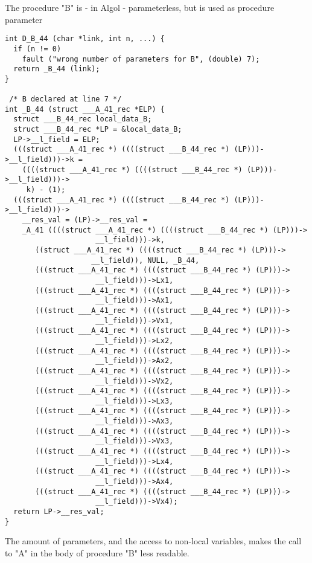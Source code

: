\documentclass[11pt]{article}
\begin{document}
The procedure "B" is - in Algol - parameterless, but is used as procedure
parameter
{\small
\begin{verbatim}
int D_B_44 (char *link, int n, ...) {
  if (n != 0)
    fault ("wrong number of parameters for B", (double) 7);
  return _B_44 (link);
}

 /* B declared at line 7 */
int _B_44 (struct ___A_41_rec *ELP) {
  struct ___B_44_rec local_data_B;
  struct ___B_44_rec *LP = &local_data_B;
  LP->__l_field = ELP;
  (((struct ___A_41_rec *) ((((struct ___B_44_rec *) (LP)))->__l_field)))->k =
    ((((struct ___A_41_rec *) ((((struct ___B_44_rec *) (LP)))->__l_field)))->
     k) - (1);
  (((struct ___A_41_rec *) ((((struct ___B_44_rec *) (LP)))->__l_field)))->
    __res_val = (LP)->__res_val =
    _A_41 ((((struct ___A_41_rec *) ((((struct ___B_44_rec *) (LP)))->
				     __l_field)))->k,
	   ((struct ___A_41_rec *) ((((struct ___B_44_rec *) (LP)))->
				    __l_field)), NULL, _B_44,
	   (((struct ___A_41_rec *) ((((struct ___B_44_rec *) (LP)))->
				     __l_field)))->Lx1,
	   (((struct ___A_41_rec *) ((((struct ___B_44_rec *) (LP)))->
				     __l_field)))->Ax1,
	   (((struct ___A_41_rec *) ((((struct ___B_44_rec *) (LP)))->
				     __l_field)))->Vx1,
	   (((struct ___A_41_rec *) ((((struct ___B_44_rec *) (LP)))->
				     __l_field)))->Lx2,
	   (((struct ___A_41_rec *) ((((struct ___B_44_rec *) (LP)))->
				     __l_field)))->Ax2,
	   (((struct ___A_41_rec *) ((((struct ___B_44_rec *) (LP)))->
				     __l_field)))->Vx2,
	   (((struct ___A_41_rec *) ((((struct ___B_44_rec *) (LP)))->
				     __l_field)))->Lx3,
	   (((struct ___A_41_rec *) ((((struct ___B_44_rec *) (LP)))->
				     __l_field)))->Ax3,
	   (((struct ___A_41_rec *) ((((struct ___B_44_rec *) (LP)))->
				     __l_field)))->Vx3,
	   (((struct ___A_41_rec *) ((((struct ___B_44_rec *) (LP)))->
				     __l_field)))->Lx4,
	   (((struct ___A_41_rec *) ((((struct ___B_44_rec *) (LP)))->
				     __l_field)))->Ax4,
	   (((struct ___A_41_rec *) ((((struct ___B_44_rec *) (LP)))->
				     __l_field)))->Vx4);
  return LP->__res_val;
}
\end{verbatim}
}
The amount of parameters, and the access to non-local variables, makes the
call to "A" in the body of procedure "B" less readable.
\end{document}
